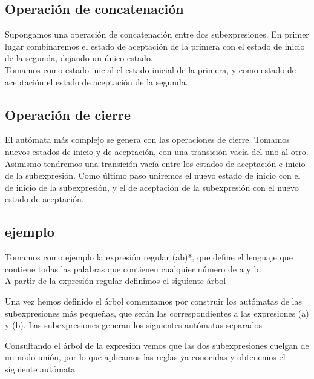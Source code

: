 
\subsection{Operación de concatenación}
Supongamos una operación de concatenación entre dos subexpresiones.
En primer lugar combinaremos el estado de aceptación de la primera con el estado de inicio de la segunda, dejando un único estado.
\\
Tomamos como estado inicial el estado inicial de la primera, y como estado de aceptación el estado de aceptación de la segunda.


\subsection{Operación de cierre}
El autómata más complejo se genera con las operaciones de cierre.
Tomamos nuevos estados de inicio y de aceptación, con una transición vacía del uno al otro.
Asimismo tendremos una transición vacía entre los estados de aceptación e inicio de la subexpresión.
Como último paso uniremos el nuevo estado de inicio con el de inicio de la subexpresión, y el de aceptación de la subexpresión con el nuevo estado de aceptación.


\subsection{ejemplo}
Tomamos como ejemplo la expresión regular (a\textbar b)*, que define el lenguaje que contiene todas las palabras que contienen cualquier número de a y b.
\\
A partir de la expresión regular definimos el siguiente árbol


Una vez hemos definido el árbol comenzamos por construir los autómatas de las subexpresiones más pequeñas, que serán las correspondientes a las expresiones (a) y (b).
Las subexpresiones generan los siguientes autómatas separados


Consultando el árbol de la expresión vemos que las dos subexpresiones cuelgan de un nodo unión, por lo que aplicamos las reglas ya conocidas y obtenemos el siguiente autómata

